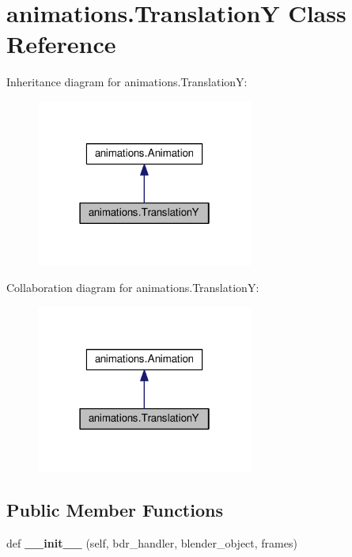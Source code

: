 \hypertarget{classanimations_1_1TranslationY}{}\section{animations.\+TranslationY Class Reference}
\label{classanimations_1_1TranslationY}


Inheritance diagram for animations.\+TranslationY\+:\nopagebreak
\begin{figure}[H]
\begin{center}
\leavevmode
\includegraphics[width=202pt]{classanimations_1_1TranslationY__inherit__graph}
\end{center}
\end{figure}


Collaboration diagram for animations.\+TranslationY\+:\nopagebreak
\begin{figure}[H]
\begin{center}
\leavevmode
\includegraphics[width=202pt]{classanimations_1_1TranslationY__coll__graph}
\end{center}
\end{figure}
\subsection*{Public Member Functions}
\begin{DoxyCompactItemize}
\item 
def {\bfseries \+\_\+\+\_\+init\+\_\+\+\_\+} (self, bdr\+\_\+handler, blender\+\_\+object, frames)\hypertarget{classanimations_1_1TranslationY_ae8fa8e1b9e86470fb55294820b515cfa}{}\label{classanimations_1_1TranslationY_ae8fa8e1b9e86470fb55294820b515cfa}

\end{DoxyCompactItemize}

